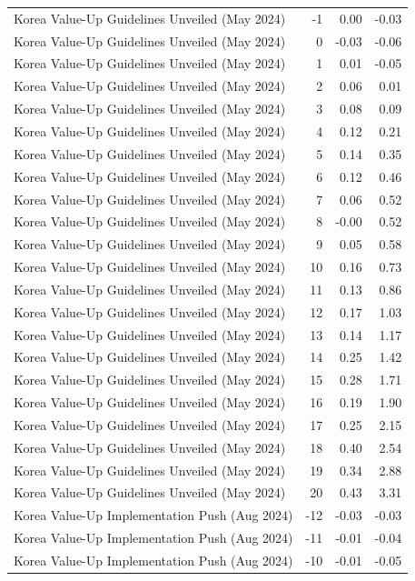 \begin{table}
\begin{tabular}{lrrr}
Korea Value-Up Guidelines Unveiled (May 2024) & -1 & 0.00 & -0.03 \\
Korea Value-Up Guidelines Unveiled (May 2024) & 0 & -0.03 & -0.06 \\
Korea Value-Up Guidelines Unveiled (May 2024) & 1 & 0.01 & -0.05 \\
Korea Value-Up Guidelines Unveiled (May 2024) & 2 & 0.06 & 0.01 \\
Korea Value-Up Guidelines Unveiled (May 2024) & 3 & 0.08 & 0.09 \\
Korea Value-Up Guidelines Unveiled (May 2024) & 4 & 0.12 & 0.21 \\
Korea Value-Up Guidelines Unveiled (May 2024) & 5 & 0.14 & 0.35 \\
Korea Value-Up Guidelines Unveiled (May 2024) & 6 & 0.12 & 0.46 \\
Korea Value-Up Guidelines Unveiled (May 2024) & 7 & 0.06 & 0.52 \\
Korea Value-Up Guidelines Unveiled (May 2024) & 8 & -0.00 & 0.52 \\
Korea Value-Up Guidelines Unveiled (May 2024) & 9 & 0.05 & 0.58 \\
Korea Value-Up Guidelines Unveiled (May 2024) & 10 & 0.16 & 0.73 \\
Korea Value-Up Guidelines Unveiled (May 2024) & 11 & 0.13 & 0.86 \\
Korea Value-Up Guidelines Unveiled (May 2024) & 12 & 0.17 & 1.03 \\
Korea Value-Up Guidelines Unveiled (May 2024) & 13 & 0.14 & 1.17 \\
Korea Value-Up Guidelines Unveiled (May 2024) & 14 & 0.25 & 1.42 \\
Korea Value-Up Guidelines Unveiled (May 2024) & 15 & 0.28 & 1.71 \\
Korea Value-Up Guidelines Unveiled (May 2024) & 16 & 0.19 & 1.90 \\
Korea Value-Up Guidelines Unveiled (May 2024) & 17 & 0.25 & 2.15 \\
Korea Value-Up Guidelines Unveiled (May 2024) & 18 & 0.40 & 2.54 \\
Korea Value-Up Guidelines Unveiled (May 2024) & 19 & 0.34 & 2.88 \\
Korea Value-Up Guidelines Unveiled (May 2024) & 20 & 0.43 & 3.31 \\
Korea Value-Up Implementation Push (Aug 2024) & -12 & -0.03 & -0.03 \\
Korea Value-Up Implementation Push (Aug 2024) & -11 & -0.01 & -0.04 \\
Korea Value-Up Implementation Push (Aug 2024) & -10 & -0.01 & -0.05 \\

\end{tabular}
\end{table}
